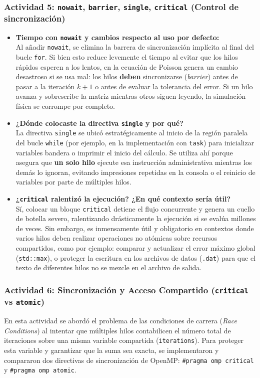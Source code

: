 \subsubsection*{Actividad 5: \texttt{nowait}, \texttt{barrier}, \texttt{single}, \texttt{critical} (Control de sincronización)}
\begin{itemize}
    \item \textbf{Tiempo con \texttt{nowait} y cambios respecto al uso por defecto:} \\
    Al añadir \texttt{nowait}, se elimina la barrera de sincronización implícita al final del bucle \texttt{for}. Si bien esto reduce levemente el tiempo al evitar que los hilos rápidos esperen a los lentos, en la ecuación de Poisson genera un cambio desastroso si se usa mal: los hilos \textbf{deben} sincronizarse (\textit{barrier}) antes de pasar a la iteración $k+1$ o antes de evaluar la tolerancia del error. Si un hilo avanza y sobrescribe la matriz mientras otros siguen leyendo, la simulación física se corrompe por completo.
    \item \textbf{¿Dónde colocaste la directiva \texttt{single} y por qué?} \\
    La directiva \texttt{single} se ubicó estratégicamente al inicio de la región paralela del bucle \texttt{while} (por ejemplo, en la implementación con \texttt{task}) para inicializar variables bandera o imprimir el inicio del cálculo. Se utiliza ahí porque asegura que \textbf{un solo hilo} ejecute esa instrucción administrativa mientras los demás lo ignoran, evitando impresiones repetidas en la consola o el reinicio de variables por parte de múltiples hilos.
    \item \textbf{¿\texttt{critical} ralentizó la ejecución? ¿En qué contexto sería útil?} \\
    Sí, colocar un bloque \texttt{critical} detiene el flujo concurrente y genera un cuello de botella severo, ralentizando drásticamente la ejecución si se evalúa millones de veces. Sin embargo, es inmensamente útil y obligatorio en contextos donde varios hilos deben realizar operaciones no atómicas sobre recursos compartidos, como por ejemplo: comparar y actualizar el error máximo global (\texttt{std::max}), o proteger la escritura en los archivos de datos (\texttt{.dat}) para que el texto de diferentes hilos no se mezcle en el archivo de salida.
\end{itemize}

\subsubsection*{Actividad 6: Sincronización y Acceso Compartido (\texttt{critical} vs \texttt{atomic})}
En esta actividad se abordó el problema de las condiciones de carrera (\textit{Race Conditions}) al intentar que múltiples hilos contabilicen el número total de iteraciones sobre una misma variable compartida (\texttt{iterations}). Para proteger esta variable y garantizar que la suma sea exacta, se implementaron y compararon dos directivas de sincronización de OpenMP: \texttt{\#pragma omp critical} y \texttt{\#pragma omp atomic}.

